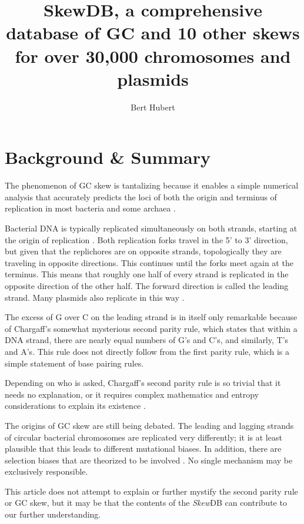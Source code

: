 \documentclass[fleqn,10pt]{wlscirep}
\title{SkewDB, a comprehensive database of GC and 10 other skews for over 30,000 chromosomes and plasmids}
\author[*]{Bert Hubert}
\affil[*]{corresponding author: Bert Hubert (bert@hubertnet.nl)}
\begin{document}
\flushbottom
\maketitle
\thispagestyle{empty}

\section*{Background \& Summary}
The phenomenon of GC skew\cite{pmid:10570985, Marn2008, Quan2019} is tantalizing because it enables a simple numerical analysis that accurately predicts the loci of both the origin and terminus of replication in most bacteria and some archaea \cite{lu_skewit_2020,luo_doric_2019}.

Bacterial DNA is typically replicated simultaneously on both strands, starting at the origin of replication \cite{ODonnell2013}. Both replication forks travel in the 5' to 3' direction, but given that the replichores are on opposite strands, topologically they are traveling in opposite directions. This continues until the forks meet again at the terminus. This means that roughly one half of every strand is replicated in the opposite direction of the other half. The forward direction is called the leading strand. Many plasmids also replicate in this way \cite{Lilly2015}.

The excess of G over C on the leading strand is in itself only remarkable because of Chargaff's somewhat mysterious second parity rule\cite{rudner_separation_1968}, which states that within a DNA strand, there are nearly equal numbers of G's and C's, and similarly, T's and A's. This rule does not directly follow from the first parity rule, which is a simple statement of base pairing rules.

Depending on who is asked, Chargaff's second parity rule is so trivial that it needs no explanation, or it requires complex mathematics and entropy considerations to explain its existence \cite{fariselli_dna_2020}.

The origins of GC skew are still being debated. The leading and lagging strands of circular bacterial chromosomes are replicated very differently; it is at least plausible that this leads to different mutational biases. In addition, there are selection biases that are theorized to be involved \cite{tillier_contributions_2000}. No single mechanism may be exclusively responsible.

This article does not attempt to explain or further mystify \cite{zhang_brief_2014} the second parity rule or GC skew, but it may be that the contents of the \emph{Skew}DB can contribute to our further understanding.
\end{document}
